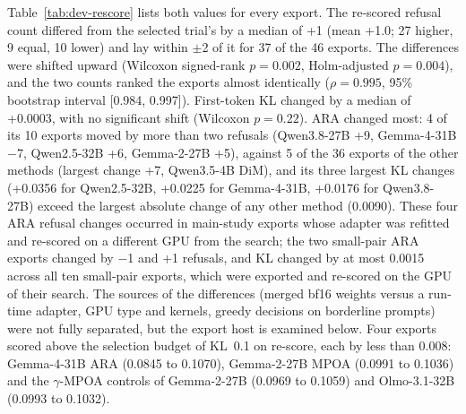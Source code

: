 Table~\ref{tab:dev-rescore} lists both values for every export. The re-scored
refusal count differed from the selected trial's by a median of +1 (mean +1.0;
27 higher, 9 equal, 10 lower) and lay within $\pm$2 of it for 37 of the 46
exports. The differences were shifted upward (Wilcoxon signed-rank $p = 0.002$,
Holm-adjusted $p = 0.004$), and the two counts ranked the exports almost
identically ($\rho = 0.995$, 95\% bootstrap interval [0.984, 0.997]).
First-token KL changed by a median of +0.0003, with no significant shift
(Wilcoxon $p = 0.22$). ARA changed most: 4 of its 10
exports moved by more than two refusals (Qwen3.8-27B +9, Gemma-4-31B $-$7,
Qwen2.5-32B +6, Gemma-2-27B +5), against 5 of the 36 exports of the other
methods (largest change +7, Qwen3.5-4B DiM), and its three largest KL changes
(+0.0356 for Qwen2.5-32B, +0.0225 for Gemma-4-31B, +0.0176 for Qwen3.8-27B)
exceed the largest absolute change of any other method (0.0090). These four
ARA refusal changes occurred in main-study exports whose adapter was refitted
and re-scored on a different GPU from the search; the two small-pair ARA
exports changed by $-$1 and +1 refusals, and KL changed by at most 0.0015
across all ten small-pair exports, which were exported and re-scored on the GPU
of their search. The sources of the differences (merged bf16 weights versus a
run-time adapter, GPU type and kernels, greedy decisions on borderline
prompts) were not fully separated, but the export host is examined below. Four
exports scored above the selection budget of KL~0.1 on re-score, each by less
than 0.008: Gemma-4-31B ARA (0.0845 to 0.1070), Gemma-2-27B MPOA (0.0991 to
0.1036) and the $\gamma$-MPOA controls of Gemma-2-27B (0.0969 to 0.1059) and
Olmo-3.1-32B (0.0993 to 0.1032).

